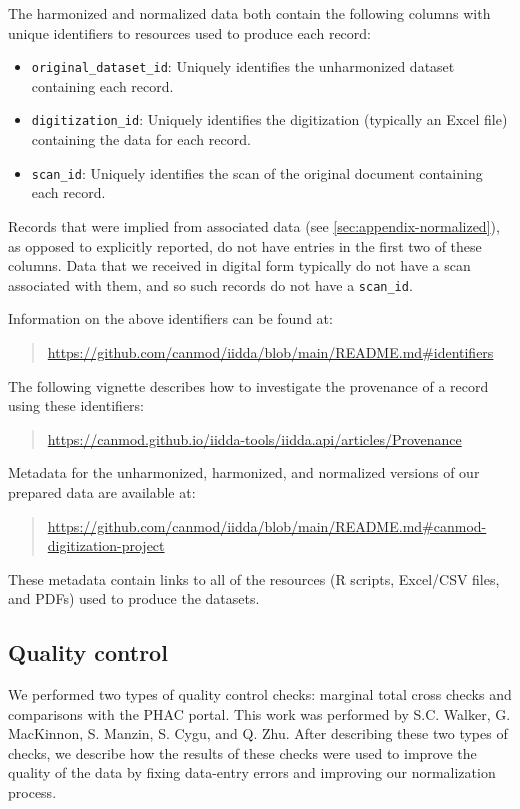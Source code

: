 \documentclass[12pt]{article}
\begin{document}
The harmonized and normalized data both contain the following columns with unique identifiers to resources used to produce each record:
\begin{itemize}
  \item \texttt{original\_dataset\_id}: Uniquely identifies the unharmonized dataset containing each record.
  \item \texttt{digitization\_id}: Uniquely identifies the digitization (typically an Excel file) containing the data for each record.
  \item \texttt{scan\_id}: Uniquely identifies the scan of the original document containing each record.
\end{itemize}
Records that were implied from associated data (see \cref{sec:appendix-normalized}), as opposed to explicitly reported, do not have entries in the first two of these columns. Data that we received in digital form typically do not have a scan associated with them, and so such records do not have a \texttt{scan\_id}.

Information on the above identifiers can be found at:
\begin{quote}
  \url{https://github.com/canmod/iidda/blob/main/README.md#identifiers}
\end{quote}
The following vignette describes how to investigate the provenance of a record using these identifiers:
\begin{quote}
  \url{https://canmod.github.io/iidda-tools/iidda.api/articles/Provenance}
\end{quote}
Metadata for the unharmonized, harmonized, and normalized versions of our prepared data are available at:
\begin{quote}
\url{https://github.com/canmod/iidda/blob/main/README.md#canmod-digitization-project}
\end{quote}
These metadata contain links to all of the resources (R scripts, Excel/CSV files, and PDFs) used to produce the datasets.

\subsection{Quality control}\label{sec:appendix-quality-control}

We performed two types of quality control checks: marginal total cross checks and comparisons with the PHAC portal. This work was performed by S.C. Walker, G. MacKinnon, S. Manzin, S. Cygu, and Q. Zhu. After describing these two types of checks, we describe how the results of these checks were used to improve the quality of the data by fixing data-entry errors and improving our normalization process.
\end{document}
